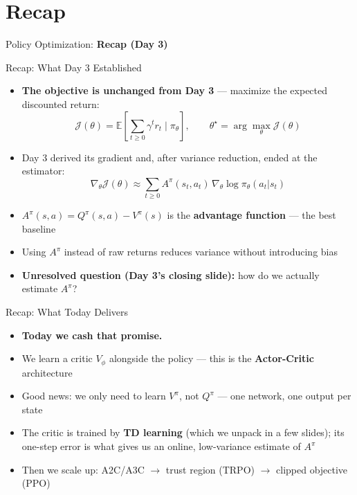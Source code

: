 \section{Recap}
\begin{frame}{}
    \LARGE Policy Optimization: \textbf{Recap (Day 3)}
\end{frame}

\begin{frame}{Recap: What Day 3 Established}
\begin{itemize}
    \item \textbf{The objective is unchanged from Day 3} --- maximize the expected discounted return:
    $$\mathcal{J}(\theta) = \mathbb{E} \left [ \sum_{t \geq 0} \gamma^t r_t \mid \pi_\theta \right ], \qquad \theta^{\star} = \arg\max_\theta \mathcal{J}(\theta)$$
    \item Day 3 derived its gradient and, after variance reduction, ended at the estimator:
    $$\nabla_\theta \mathcal{J}(\theta) \approx \sum_{t \geq 0} A^{\pi}(s_t, a_t)\, \nabla_\theta \log \pi_\theta(a_t|s_t)$$
    \item $A^{\pi}(s,a) = Q^{\pi}(s,a) - V^{\pi}(s)$ is the \textbf{advantage function} --- the best baseline
    \item Using $A^{\pi}$ instead of raw returns reduces variance without introducing bias
    \item \textbf{Unresolved question (Day 3's closing slide):} how do we actually estimate $A^{\pi}$?
\end{itemize}
\end{frame}

\begin{frame}{Recap: What Today Delivers}
\begin{itemize}
    \item \textbf{Today we cash that promise.}
    \item We learn a critic $V_\phi$ alongside the policy --- this is the \textbf{Actor-Critic} architecture
    \item Good news: we only need to learn $V^{\pi}$, not $Q^{\pi}$ --- one network, one output per state
    \item The critic is trained by \textbf{TD learning} (which we unpack in a few slides); its one-step error is what gives us an online, low-variance estimate of $A^{\pi}$
    \item Then we scale up: A2C/A3C $\rightarrow$ trust region (TRPO) $\rightarrow$ clipped objective (PPO)
\end{itemize}
\end{frame}
